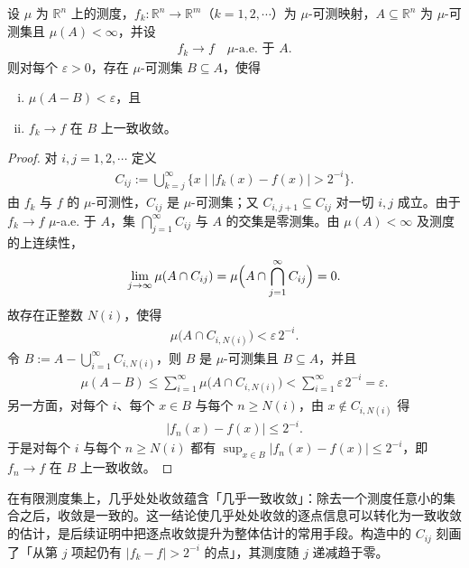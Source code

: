 \documentclass[../../main.tex]{subfiles}%
\begin{document}
\begin{theorem}[Egoroff 定理]\label{theorem:ch01-1-16}
设 $\mu$ 为 $\mathbb{R}^n$ 上的测度，$f_k:\mathbb{R}^n\to\mathbb{R}^m$（$k=1,2,\cdots$）为 $\mu$-可测映射，$A\subseteq\mathbb{R}^n$ 为 $\mu$-可测集且 $\mu(A)<\infty$，并设
\begin{align*}
f_k\to f\quad \mu\text{-a.e. 于 }A.
\end{align*}
则对每个 $\varepsilon>0$，存在 $\mu$-可测集 $B\subseteq A$，使得
\begin{enumerate}[(i)]
\item $\mu(A-B)<\varepsilon$，且
\item $f_k\to f$ 在 $B$ 上一致收敛。
\end{enumerate}
\end{theorem}

\begin{proof}
对 $i,j=1,2,\cdots$ 定义
\begin{align*}
C_{ij}:=\bigcup_{k=j}^{\infty}\bigl\{x\mid\lvert f_k(x)-f(x)\rvert>2^{-i}\bigr\}.
\end{align*}
由 $f_k$ 与 $f$ 的 $\mu$-可测性，$C_{ij}$ 是 $\mu$-可测集；又 $C_{i,j+1}\subseteq C_{ij}$ 对一切 $i,j$ 成立。由于 $f_k\to f$ $\mu$-a.e. 于 $A$，集 $\bigcap_{j=1}^{\infty}C_{ij}$ 与 $A$ 的交集是零测集。由 $\mu(A)<\infty$ 及测度的上连续性，
\begin{align*}
\lim_{j\to\infty}\mu(A\cap C_{ij})=\mu\Bigl(A\cap\bigcap_{j=1}^{\infty}C_{ij}\Bigr)=0.
\end{align*}
故存在正整数 $N(i)$，使得
\begin{align*}
\mu\bigl(A\cap C_{i,N(i)}\bigr)<\varepsilon\,2^{-i}.
\end{align*}
令 $B:=A-\bigcup_{i=1}^{\infty}C_{i,N(i)}$，则 $B$ 是 $\mu$-可测集且 $B\subseteq A$，并且
\begin{align*}
\mu(A-B)\leqslant\sum_{i=1}^{\infty}\mu\bigl(A\cap C_{i,N(i)}\bigr)<\sum_{i=1}^{\infty}\varepsilon\,2^{-i}=\varepsilon.
\end{align*}
另一方面，对每个 $i$、每个 $x\in B$ 与每个 $n\geqslant N(i)$，由 $x\notin C_{i,N(i)}$ 得
\begin{align*}
\lvert f_n(x)-f(x)\rvert\leqslant2^{-i}.
\end{align*}
于是对每个 $i$ 与每个 $n\geqslant N(i)$ 都有 $\sup_{x\in B}\lvert f_n(x)-f(x)\rvert\leqslant2^{-i}$，即 $f_n\to f$ 在 $B$ 上一致收敛。
\end{proof}

\begin{remark}\label{remark:ch01-thm-1-16-动机}
在有限测度集上，几乎处处收敛蕴含「几乎一致收敛」：除去一个测度任意小的集合之后，收敛是一致的。这一结论使几乎处处收敛的逐点信息可以转化为一致收敛的估计，是后续证明中把逐点收敛提升为整体估计的常用手段。构造中的 $C_{ij}$ 刻画了「从第 $j$ 项起仍有 $\lvert f_k-f\rvert>2^{-i}$ 的点」，其测度随 $j$ 递减趋于零。
\end{remark}
\end{document}
